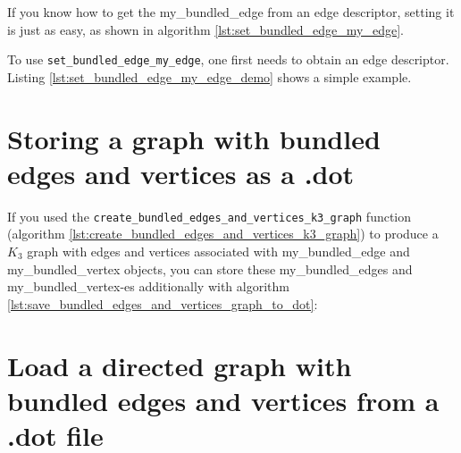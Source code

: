 If you know how to get the my_bundled_edge from an edge descriptor, 
setting it is just as easy, as shown in algorithm \ref{lst:set_bundled_edge_my_edge}.



To use \verb;set_bundled_edge_my_edge;, 
one first needs to obtain an edge descriptor.
Listing \ref{lst:set_bundled_edge_my_edge_demo}
shows a simple example.



\section{Storing a graph with bundled edges and vertices as a .dot}
\label{subsec:save_bundled_edges_and_vertices_graph_to_dot}

If you used the \verb;create_bundled_edges_and_vertices_k3_graph; 
function (algorithm \ref{lst:create_bundled_edges_and_vertices_k3_graph}) 
to produce a $K_{3}$ graph with edges and vertices 
associated with my\_bundled\_edge and my\_bundled\_vertex objects, 
you can store these my\_bundled\_edges and my\_bundled\_vertex-es
additionally with algorithm \ref{lst:save_bundled_edges_and_vertices_graph_to_dot}:



\section{Load a directed graph with bundled edges and vertices from a .dot file}
\label{subsec:sub:load_directed_bundled_edges_and_vertices_graph_from_dot}

